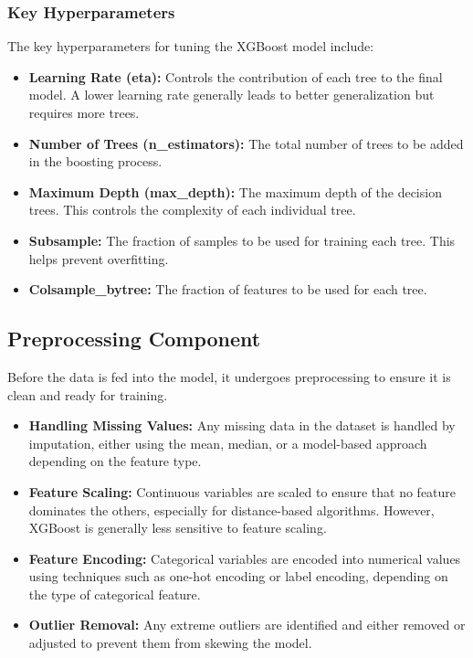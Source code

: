 \documentclass[15pt]{article}
\begin{document}
\subsubsection{Key Hyperparameters}

The key hyperparameters for tuning the XGBoost model include:

\begin{itemize}
    \item \textbf{Learning Rate (eta):} Controls the contribution of each tree to the final model. A lower learning rate generally leads to better generalization but requires more trees.
    \item \textbf{Number of Trees (n\_estimators):} The total number of trees to be added in the boosting process.
    \item \textbf{Maximum Depth (max\_depth):} The maximum depth of the decision trees. This controls the complexity of each individual tree.
    \item \textbf{Subsample:} The fraction of samples to be used for training each tree. This helps prevent overfitting.
    \item \textbf{Colsample\_bytree:} The fraction of features to be used for each tree.
\end{itemize}

\subsection{Preprocessing Component}

Before the data is fed into the model, it undergoes preprocessing to ensure it is clean and ready for training.

\begin{itemize}
    \item \textbf{Handling Missing Values:} Any missing data in the dataset is handled by imputation, either using the mean, median, or a model-based approach depending on the feature type.
    \item \textbf{Feature Scaling:} Continuous variables are scaled to ensure that no feature dominates the others, especially for distance-based algorithms. However, XGBoost is generally less sensitive to feature scaling.
    \item \textbf{Feature Encoding:} Categorical variables are encoded into numerical values using techniques such as one-hot encoding or label encoding, depending on the type of categorical feature.
    \item \textbf{Outlier Removal:} Any extreme outliers are identified and either removed or adjusted to prevent them from skewing the model.
\end{itemize}
\end{document}
